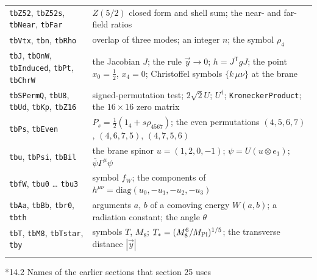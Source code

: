 \documentclass[10pt,a4paper]{article}
\makeatletter
\renewcommand\subsection{\@startsection{subsection}{2}{\z@}{-3.25ex\@plus -1ex \@minus -.2ex}{1.5ex \@plus .2ex}{\normalfont\large\bfseries\raggedright}}
\makeatother
\begin{document}
{\begin{longtable}{>{\raggedright\arraybackslash}p{}>{\raggedright\arraybackslash}p{}}
\texttt{tbZ52}, \texttt{tbZ52s}, \texttt{tbNear}, \texttt{tbFar} & $Z(5/2)$ closed form and shell sum; the near- and far-field ratios \\
\texttt{tbVtx}, \texttt{tbn}, \texttt{tbRho} & overlap of three modes; an integer $n$; the symbol $\rho_4$ \\
\texttt{tbJ}, \texttt{tbOnW}, \texttt{tbInduced}, \texttt{tbPt}, \texttt{tbChrW} & the Jacobian $J$; the rule $\vec y\to0$; $h=J^{\mathsf T}gJ$; the point $x_0=\frac12$, $x_4=0$; Christoffel symbols $\{k\,\mu\nu\}$ at the brane \\
\texttt{tbSPermQ}, \texttt{tbU8}, \texttt{tbUd}, \texttt{tbKp}, \texttt{tbZ16} & signed-permutation test; $2\sqrt2U$; $U^\dagger$; \texttt{KroneckerProduct}; the $16\times16$ zero matrix \\
\texttt{tbPs}, \texttt{tbEven} & $P_s=\frac12(1_4+s\rho_{4567})$; the even permutations $(4,5,6,7)$, $(4,6,7,5)$, $(4,7,5,6)$ \\
\texttt{tbu}, \texttt{tbPsi}, \texttt{tbBil} & the brane spinor $u=(1,2,0,-1)$; $\psi=U(u\otimes e_1)$; $\bar\psi\Gamma^\mu\psi$ \\
\texttt{tbfW}, \texttt{tbu0} … \texttt{tbu3} & symbol $f_W$; the components of $h^{\mu\nu}=\mathrm{diag}(u_0,-u_1,-u_2,-u_3)$ \\
\texttt{tbAa}, \texttt{tbBb}, \texttt{tbr0}, \texttt{tbth} & arguments $a$, $b$ of a comoving energy $W(a,b)$; a radiation constant; the angle $\theta$ \\
\texttt{tbT}, \texttt{tbM8}, \texttt{tbTstar}, \texttt{tby} & symbols $T$, $M_8$; $T_*=(M_8^6/M_{\rm Pl})^{1/5}$; the transverse distance $|\vec y|$ \\*
\end{longtable}}
\subsection*{14.2 Names of the earlier sections that section 25 uses}
\end{document}
